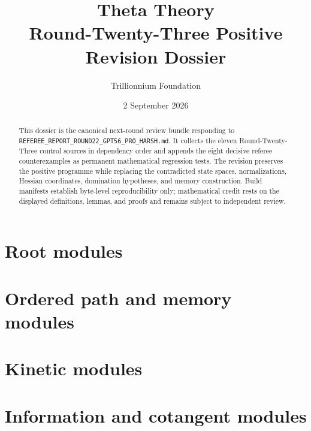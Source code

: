\documentclass[11pt]{article}
\title{Theta Theory\\Round-Twenty-Three Positive Revision Dossier}
\author{Trillionnium Foundation}
\date{2 September 2026}
\theoremstyle{definition}
\theoremstyle{remark}
\begin{document}
\maketitle

\begin{abstract}
This dossier is the canonical next-round review bundle responding to
\texttt{REFEREE\_REPORT\_ROUND22\_GPT56\_PRO\_HARSH.md}.  It collects the
eleven Round-Twenty-Three control sources in dependency order and appends the
eight decisive referee counterexamples as permanent mathematical regression
tests.  The revision preserves the positive programme while replacing the
contradicted state spaces, normalizations, Hessian coordinates, domination
hypotheses, and memory construction.  Build manifests establish byte-level
reproducibility only; mathematical credit rests on the displayed definitions,
lemmas, and proofs and remains subject to independent review.
\end{abstract}

\tableofcontents
\clearpage

\part{Root modules}


\clearpage

\clearpage

\part{Ordered path and memory modules}


\clearpage

\clearpage

\part{Kinetic modules}


\clearpage

\clearpage

\clearpage

\clearpage

\part{Information and cotangent modules}
\end{document}
